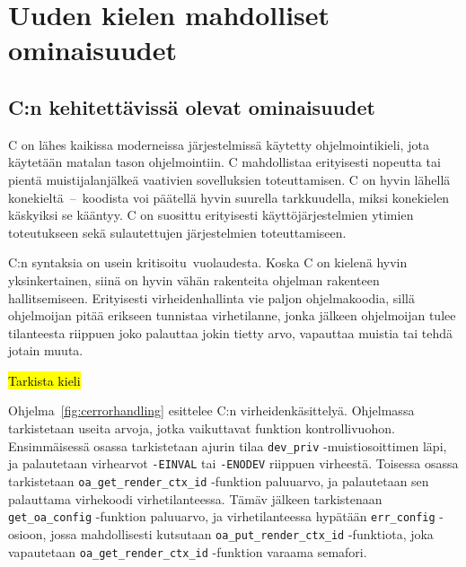 \section{Uuden kielen mahdolliset ominaisuudet}

\subsection{C:n kehitettävissä olevat ominaisuudet}


C on lähes kaikissa moderneissa järjestelmissä käytetty ohjelmointikieli, jota
käytetään matalan tason ohjelmointiin. C mahdollistaa erityisesti nopeutta tai
pientä muistijalanjälkeä vaativien sovelluksien toteuttamisen. C on hyvin
lähellä konekieltä~--~koodista voi päätellä hyvin suurella tarkkuudella, miksi
konekielen käskyiksi se kääntyy. C on suosittu erityisesti käyttöjärjestelmien
ytimien toteutukseen sekä sulautettujen järjestelmien toteuttamiseen.%

C:n syntaksia on usein kritisoitu\citationneeded~vuolaudesta. Koska C on
kielenä hyvin yksinkertainen, siinä on hyvin vähän rakenteita ohjelman
rakenteen hallitsemiseen. Erityisesti virheidenhallinta vie paljon
ohjelmakoodia, sillä ohjelmoijan pitää erikseen tunnistaa virhetilanne,
jonka jälkeen ohjelmoijan tulee tilanteesta riippuen joko palauttaa jokin
tietty arvo, vapauttaa muistia tai tehdä jotain muuta.

\hl{Tarkista kieli}

Ohjelma~\ref{fig:cerrorhandling} esittelee C:n virheidenkäsittelyä. Ohjelmassa
tarkistetaan useita arvoja, jotka vaikuttavat funktion kontrollivuohon.
Ensimmäisessä osassa tarkistetaan ajurin tilaa \texttt{dev\_priv}
-muistiosoittimen läpi, ja palautetaan virhearvot \texttt{-EINVAL} tai
\texttt{-ENODEV} riippuen virheestä. Toisessa osassa tarkistetaan
\texttt{oa\_get\_render\_ctx\_id} -funktion paluuarvo, ja palautetaan sen
palauttama virhekoodi virhetilanteessa. Tämäv jälkeen tarkistenaan
\texttt{get\_oa\_config} -funktion paluuarvo, ja virhetilanteessa hypätään
\texttt{err\_config} -osioon, jossa mahdollisesti kutsutaan
\texttt{oa\_put\_render\_ctx\_id} -funktiota, joka vapautetaan
\texttt{oa\_get\_render\_ctx\_id} -funktion varaama semafori.


